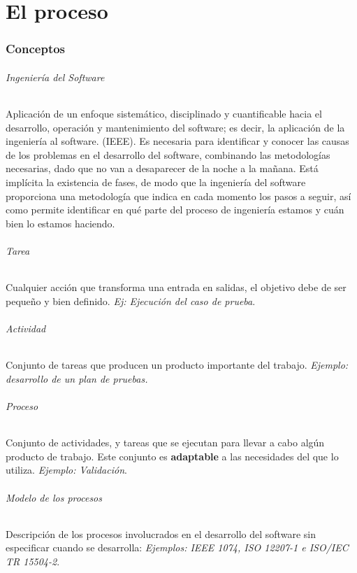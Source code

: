 \part{El proceso}

\section{Conceptos}

\paragraph{Ingeniería del Software} Aplicación de un enfoque sistemático, disciplinado y cuantificable hacia el desarrollo, operación y mantenimiento del software; es decir, la aplicación de la ingeniería al software. (IEEE). Es necesaria para identificar y conocer las causas de los problemas en el desarrollo del software, combinando las metodologías necesarias, dado que no van a desaparecer de la noche a la mañana. Está implícita la existencia de fases, de modo que la ingeniería del software proporciona una metodología que indica en cada momento los pasos a seguir, así como permite identificar en qué parte del proceso de ingeniería estamos y cuán bien lo estamos haciendo.

\paragraph{Tarea} Cualquier acción que transforma una entrada en salidas, el objetivo debe de ser pequeño y bien definido. \textit{Ej: Ejecución del caso de prueba}.


\paragraph{Actividad} Conjunto de tareas que producen un producto importante del trabajo. \textit{Ejemplo: desarrollo de un plan de pruebas.}

\paragraph{Proceso} Conjunto de actividades, y tareas que se ejecutan para llevar a cabo algún producto de trabajo. Este conjunto es \textbf{adaptable} a las necesidades del que lo utiliza. \textit{Ejemplo: Validación}.


\paragraph{Modelo de los procesos} Descripción de los procesos involucrados en el desarrollo del software sin especificar cuando se desarrolla: \textit{Ejemplos: IEEE 1074, ISO 12207-1 e ISO/IEC TR 15504-2}.



